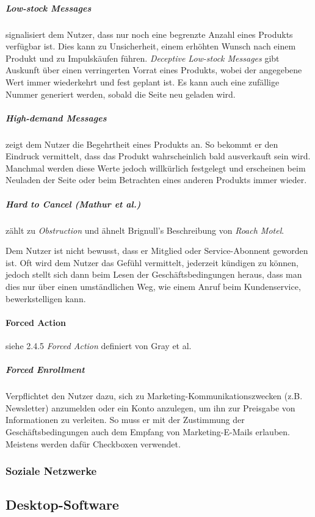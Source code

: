 \documentclass[a4paper]{article}
\begin{document}
\subparagraph{Low-stock Messages} signalisiert dem Nutzer, dass nur noch eine begrenzte Anzahl eines Produkts verfügbar ist. Dies kann zu Unsicherheit, einem erhöhten Wunsch nach einem Produkt und zu Impulskäufen führen. \textit{Deceptive Low-stock Messages} gibt Auskunft über einen verringerten Vorrat eines Produkts, wobei der angegebene Wert immer wiederkehrt und fest geplant ist. Es kann auch eine zufällige Nummer generiert werden, sobald die Seite neu geladen wird. 

\subparagraph{High-demand Messages} zeigt dem Nutzer die Begehrtheit eines Produkts an. So bekommt er den Eindruck vermittelt, dass das Produkt wahrscheinlich bald ausverkauft sein wird. Manchmal werden diese Werte jedoch willkürlich festgelegt und erscheinen beim Neuladen der Seite oder beim Betrachten eines anderen Produkts immer wieder.

\subparagraph{Hard to Cancel (Mathur et al.)} zählt zu \textit{Obstruction} und ähnelt Brignull's Beschreibung von \textit{Roach Motel}. 

Dem Nutzer ist nicht bewusst, dass er Mitglied oder Service-Abonnent geworden ist. Oft wird dem Nutzer das Gefühl vermittelt, jederzeit kündigen zu können, jedoch stellt sich dann beim Lesen der Geschäftsbedingungen heraus, dass man dies nur über einen umständlichen Weg, wie einem Anruf beim Kundenservice, bewerkstelligen kann. 

\paragraph{Forced Action}
siehe 2.4.5 \textit{Forced Action} definiert von Gray et al.

\subparagraph{Forced Enrollment}
Verpflichtet den Nutzer dazu, sich zu Marketing-Kommunikationszwecken (z.B. Newsletter) anzumelden oder ein Konto anzulegen, um ihn zur Preisgabe von Informationen zu verleiten. So muss er mit der Zustimmung der Geschäftsbedingungen auch dem Empfang von Marketing-E-Mails erlauben. Meistens werden dafür Checkboxen verwendet.

\subsubsection{Soziale Netzwerke}
\label{sub:soziale_netzwerke}

\subsection{Desktop-Software}
\label{sub:desktop-software}
\end{document}
